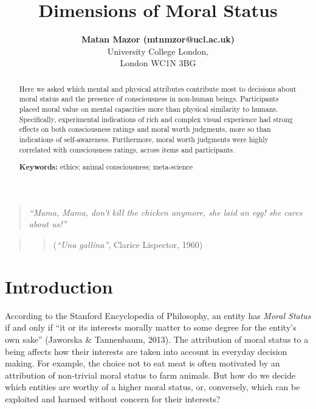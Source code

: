 \documentclass[10pt, letterpaper]{article}
\title{Dimensions of Moral Status}
\author{{\large \bf Matan Mazor (mtnmzor@ucl.ac.uk)}  \AND {\large \bf Arianna Risoli (arianna.risoli.18@ucl.ac.uk)  \large \bf Anna Eberhardt (anna.everhardt.18@ucl.ac.uk)} \AND {\large \bf Stephen M. Fleming (stephen.fleming@ucl.ac.uk)} \\ University College London, \\ London WC1N 3BG}
\begin{document}
\maketitle

\begin{abstract}
Here we asked which mental and physical attributes contribute most to
decisions about moral status and the presence of consciousness in
non-human beings. Participants placed moral value on mental capacities
more than physical similarity to humans. Specifically, experimental
indications of rich and complex visual experience had strong effects on
both consciousness ratings and moral worth judgments, more so than
indications of self-awareness. Furthermore, moral worth judgments were
highly correlated with consciousness ratings, across items and
participants.

\textbf{Keywords:}
ethics; animal consciousness; meta-science
\end{abstract}

\begin{quote}
\emph{``Mama, Mama, don't kill the chicken anymore, she laid an egg! she
cares about us!''}
\end{quote}

\begin{quote}
\begin{quote}
(\emph{``Una gallina''}, Clarice Lispector, 1960)
\end{quote}
\end{quote}

\hypertarget{introduction}{%
\section{Introduction}\label{introduction}}

According to the Stanford Encyclopedia of Philosophy, an entity has
\emph{Moral Status} if and only if ``it or its interests morally matter
to some degree for the entity's own sake'' (Jaworska \& Tannenbaum,
2013). The attribution of moral status to a being affects how their
interests are taken into account in everyday decision making. For
example, the choice not to eat meat is often motivated by an attribution
of non-trivial moral status to farm animals. But how do we decide which
entities are worthy of a higher moral status, or, conversely, which can
be exploited and harmed without concern for their interests?
\end{document}

